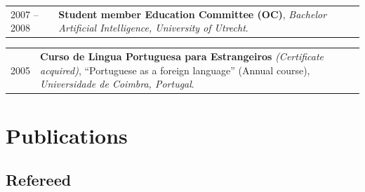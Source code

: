 \documentclass[a4paper,10pt]{article}
\def\leftcolwidth{.12\textwidth}
\def\tablevspace{10pt}
\begin{document}
\vspace{\tablevspace}

\noindent
\begin{tabularx}{\textwidth}{ p{\leftcolwidth} X }
  2007 -- 2008
  & \textbf{Student member Education Committee (OC)},
    \textit{Bachelor Artificial Intelligence, University of Utrecht}.\\
\end{tabularx}

\vspace{\tablevspace}

\noindent
\begin{tabularx}{\textwidth}{ p{\leftcolwidth} X }
  2005 & \textbf{Curso de Lingua Portuguesa para Estrangeiros} 
         \textit{(Certificate acquired)}, ``Portuguese as a foreign language''
         (Annual course), \textit{Universidade de Coimbra, Portugal}.
\end{tabularx}




\section*{Publications}

\subsection*{Refereed}
\end{document}
